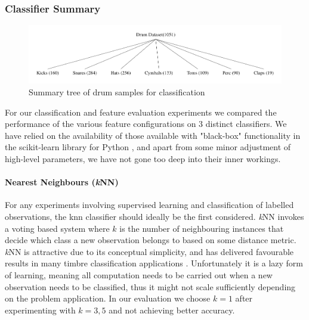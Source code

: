 {{{{\subsubsection{Classifier Summary}

\begin{figure}
	\begin{center}
		\includegraphics[width=1.0\textwidth]{ch05_pyconcat/figures/drum_distribution.pdf}
	\end{center}
	\caption[Summary tree of drum samples for classification]{Summary tree of drum samples for classification}
	\label{fig:drum_tree}
\end{figure}

For our classification and feature evaluation experiments we compared the performance of the various feature configurations on 3 distinct classifiers. We have relied on the availability of those available with "black-box" functionality in the scikit-learn library for Python \citep{Pedregosa2012}, and apart from some minor adjustment of high-level parameters, we have not gone too deep into their inner workings.

\paragraph{Nearest Neighbours (\textit{k}NN)}

For any experiments involving supervised learning and classification of labelled observations, the \acrfull{knn} classifier should ideally be the first considered. \textit{k}NN invokes a voting based system where $k$ is the number of neighbouring instances that decide which class a new observation belongs to based on some distance metric. \textit{k}NN is attractive due to its conceptual simplicity, and has delivered favourable results in many timbre classification applications \citep{Herrera2002, Herrera2003, Herrera-Boyer2003, Cano2004, Cano2005, Mandel2005, Wang2006, Somerville2008}. Unfortunately it is a lazy form of learning, meaning all computation needs to be carried out when a new observation needs to be classified, thus it might not scale sufficiently depending on the problem application. In our evaluation we choose $k=1$ after  experimenting with $k=3,5$ and not achieving better accuracy.

}}}}
